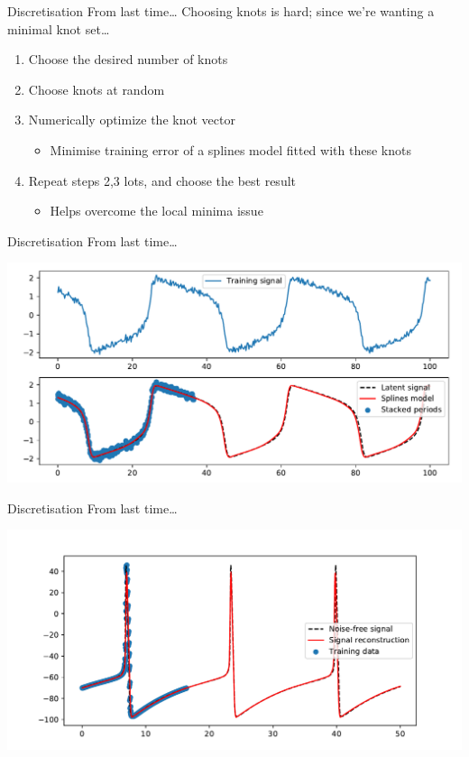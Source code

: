 \documentclass[presentation]{beamer}
\begin{document}
\begin{frame}[label={sec:org848c8b2}]{Discretisation}
From last time\ldots{}
\vfill
Choosing knots is hard; since we're wanting a minimal knot set\ldots{}
\begin{enumerate}[<+->]
\item Choose the desired number of knots
\item Choose knots at random
\item Numerically optimize the knot vector
\begin{itemize}
\item Minimise training error of a splines model fitted with these knots
\end{itemize}
\item Repeat steps 2,3 lots, and choose the best result
\begin{itemize}
\item Helps overcome the local minima issue
\end{itemize}
\end{enumerate}
\end{frame}

\begin{frame}[label={sec:org953b5f1}]{Discretisation}
From last time\ldots{}

\begin{center}
\includegraphics[width=.9\linewidth]{./fit3.pdf}
\end{center}
\end{frame}

\begin{frame}[label={sec:org29144c8}]{Discretisation}
From last time\ldots{}

\begin{center}
\includegraphics[width=.9\linewidth]{./HHFit2.pdf}
\end{center}
\end{frame}
\end{document}
